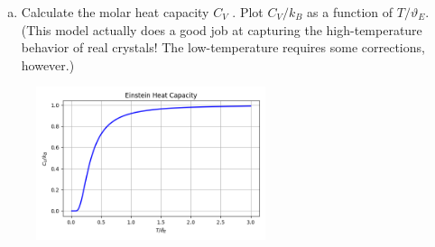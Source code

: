 \begin{enumerate}
\begin{enumerate}[(a)]
        \pagebreak

      \item Calculate the molar heat capacity $C_V$ . Plot $C_V /k_B$
        as a function of $T /\vartheta_E$. (This model actually
          does a good job at capturing the high-temperature behavior
          of real crystals! The low-temperature
        requires some corrections, however.)


    \end{enumerate}

\end{enumerate}

\begin{figure}[h]
    \centering
        \includegraphics[width=0.6\textwidth]{./assets/Figure_1.png}
\end{figure}



